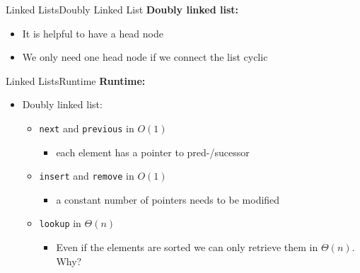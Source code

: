 
\begin{frame}{Linked Lists}{Doubly Linked List}
  \textbf{Doubly linked list:}
  \begin{itemize}
    \item<2->
      It is helpful to have a {\color{Mittel-Blau}head} node
    \item<3->
      We only need {\color{Mittel-Blau}one head} node if we connect the list
      cyclic
  \end{itemize}
  \begin{flushleft}
    
  \end{flushleft}
\end{frame}


\begin{frame}{Linked Lists}{Runtime}
  \textbf{Runtime:}
  \begin{itemize}
  \item<2->
    Doubly linked list:
    \begin{itemize}
    \item<3-> {\color{Mittel-Blau}\texttt{next}} and {\color{Mittel-Blau}\texttt{previous}} in $O(1)$
      \begin{itemize}
      \item<4-> each element has a pointer to pred-/sucessor
      \end{itemize}
    \item<5-> {\color{Mittel-Blau}\texttt{insert}} and {\color{Mittel-Blau}\texttt{remove}} in $O(1)$
      \begin{itemize}
      \item<6-> a constant number of pointers needs to be modified
      \end{itemize}
    \item<7-> {\color{Mittel-Blau}\texttt{lookup}} in $\Theta(n)$
      \begin{itemize}
      \item<8-> Even if the elements are sorted we can only retrieve them in $\Theta(n)$.\\ Why?
      \end{itemize}
    \end{itemize}
  \end{itemize}  
\end{frame}

